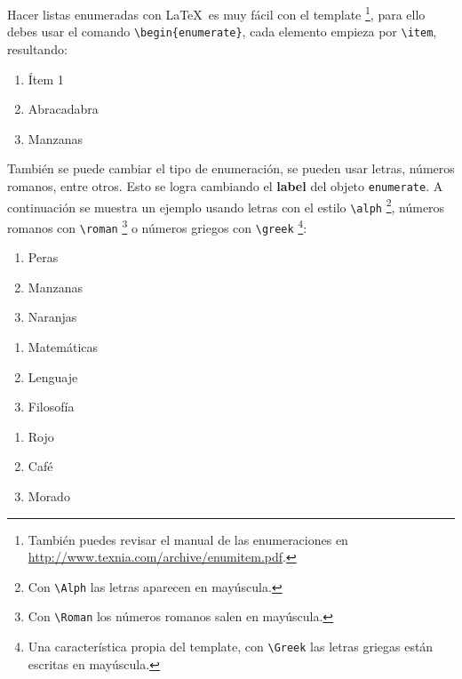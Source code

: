 	
		
		Hacer listas enumeradas con \LaTeX\ es muy fácil con el template \footnote{También puedes revisar el manual de las enumeraciones en \url{http://www.texnia.com/archive/enumitem.pdf}.}, para ello debes usar el comando \texttt{\textbackslash begin\{enumerate\}}, cada elemento empieza por \texttt{\textbackslash item}, resultando:
		
		\begin{enumerate}
			\item Ítem 1
			\item Abracadabra
			\item Manzanas
		\end{enumerate}
		
		También se puede cambiar el tipo de enumeración, se pueden usar letras, números romanos, entre otros. Esto se logra cambiando el \textbf{label} del objeto \texttt{enumerate}. A continuación se muestra un ejemplo usando letras con el estilo \texttt{\textbackslash alph} \footnote{Con \texttt{\textbackslash Alph} las letras aparecen en mayúscula.}, números romanos con \texttt{\textbackslash roman} \footnote{Con \texttt{\textbackslash Roman} los números romanos salen en mayúscula.} o números griegos con \texttt{\textbackslash greek} \footnote{Una característica propia del template, con \texttt{\textbackslash Greek} las letras griegas están escritas en mayúscula.}:
		
		\begin{multicols}{3}
			\begin{enumerate}[label=\alph*) ,font=\bfseries] %
				\item Peras
				\item Manzanas
				\item Naranjas
			\end{enumerate}
			
			\begin{enumerate}[label=\greek*) ]
				\item Matemáticas
				\item Lenguaje
				\item Filosofía
			\end{enumerate}
		
			\begin{enumerate}[label=\roman*) ]
				\item Rojo
				\item Café
				\item Morado
			\end{enumerate}
		\end{multicols}
		
